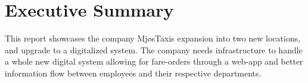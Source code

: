 \section*{Executive Summary}
\label{chap:exSummary}

This report showcases the company MjøsTaxis expansion into two new locations, and upgrade to a digitalized system.
The company needs infrastructure to handle a whole new digital system allowing for fare-orders through a web-app and better information flow between employees and their respective departments.